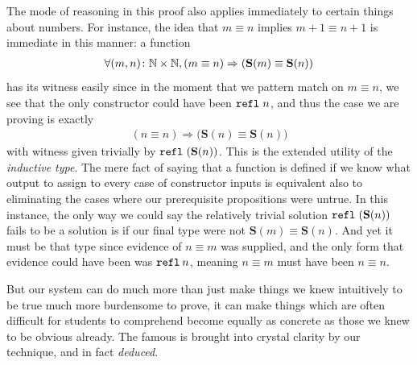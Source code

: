 \documentclass[11pt]{article}
\begin{document}
The mode of reasoning in this proof also applies immediately to certain things about numbers. For instance, the idea that $m \equiv n$ implies $m + 1 \equiv n + 1$ is immediate in this manner: a function \begin{gather*}
\forall (m, n) \colon \mathbb{N} \times \mathbb{N}, (m \equiv n) \Rightarrow (\mathbf{S}(m) \equiv \mathbf{S}(n))
\end{gather*}
has its witness easily since in the moment that we pattern match on $m \equiv n$, we see that the only constructor could have been $\mathtt{refl} \hspace{0.3em} n$, and thus the case we are proving is exactly \begin{gather*}
(n \equiv n) \Rightarrow \big(\mathbf{S}(n) \equiv \mathbf{S}(n) \big)
\end{gather*}
with witness given trivially by $\mathtt{refl} \hspace{0.3em} (\mathbf{S}(n))$. This is the extended utility of the \emph{inductive type}. The mere fact of saying that a function is defined if we know what output to assign to every case of constructor inputs is equivalent also to eliminating the cases where our prerequisite propositions were untrue. In this instance, the only way we could say the relatively trivial solution $\mathtt{refl} \hspace{0.3em} (\mathbf{S}(n))$ fails to be a solution is if our final type were not $\mathbf{S}(m) \equiv \mathbf{S}(n)$. And yet it must be that type since evidence of $n \equiv m$ was supplied, and the only form that evidence could have been was $\mathtt{refl} \hspace{0.2em} n$, meaning $n \equiv m$ must have been $n \equiv n$.

But our system can do much more than just make things we knew intuitively to be true much more burdensome to prove, it can make things which are often difficult for students to comprehend become equally as concrete as those we knew to be obvious already. The famous  is brought into crystal clarity by our technique, and in fact \emph{deduced}.
\end{document}
